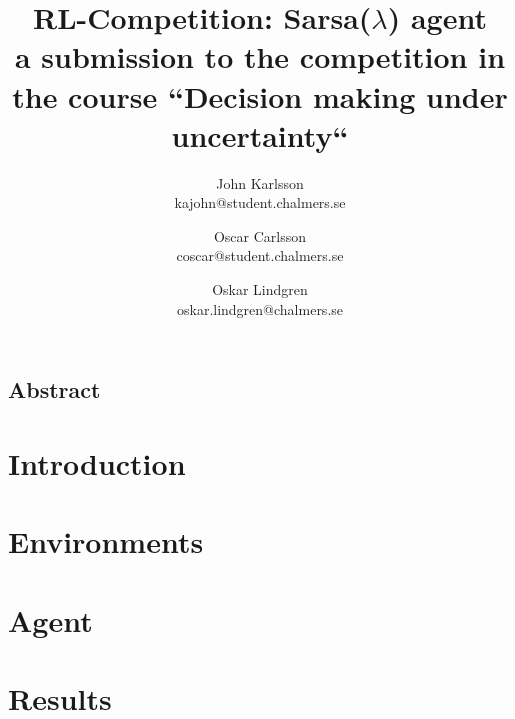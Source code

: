 \documentclass[letterpaper,twocolumn,10pt]{article}
\begin{document}
\date{}

\title{ RL-Competition: Sarsa($\lambda$) agent\\ \small a submission to the
    competition in the course ``Decision making under uncertainty``}

\author{
{\rm John Karlsson}\\
kajohn@student.chalmers.se
\and
{\rm Oscar Carlsson}\\
coscar@student.chalmers.se
\and
{\rm Oskar Lindgren}\\
oskar.lindgren@chalmers.se
}

\maketitle

\thispagestyle{empty}

\subsection*{Abstract}


\section{Introduction}


\section{Environments}


\section{Agent}


\section{Results}


{\footnotesize 
}

\end{document}
